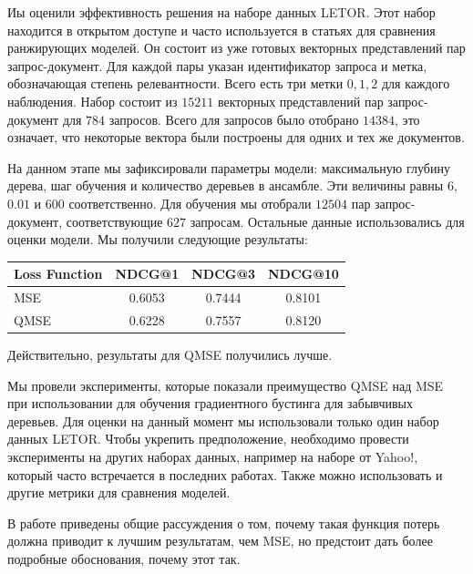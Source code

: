 \documentclass[specialist,
               substylefile = spbu.rtx,
               subf,href,colorlinks=true, 12pt]{disser}
\begin{document}
Иы оценили эффективность решения на наборе данных LETOR\cite{LETOR}. Этот набор находится в открытом доступе и часто используется в статьях для сравнения ранжирующих моделей. Он состоит из уже готовых векторных представлений пар запрос-документ. Для каждой пары указан идентификатор запроса и метка, обозначающая степень релевантности. Всего есть три метки $0, 1, 2$ для каждого наблюдения. Набор состоит из $15211$ векторных представлений пар запрос-документ для $784$ запросов. Всего для запросов было отобрано $14384$, это означает, что некоторые вектора были построены для одних и тех же документов.\par

На данном этапе мы зафиксировали параметры модели: максимальную глубину дерева, шаг обучения и количество деревьев в ансамбле. Эти величины равны $6$, $0.01$ и $600$ соответственно. Для обучения мы отобрали $12504$ пар запрос-документ, соответствующие $627$ запросам. Остальные данные использовались для оценки модели. Мы получили следующие результаты:\par 

\begin{center}
\begin{tabular} {l | c | c | c }
Loss Function & NDCG@1 & NDCG@3 &  NDCG@10 \\ \hline
MSE & 0.6053 & 0.7444 & 0.8101 \\ \hline
QMSE & 0.6228 & 0.7557 & 0.8120
\end{tabular}
\end{center}

Действительно, результаты для QMSE  получились лучше.

\conclusion

Мы провели эксперименты, которые показали преимущество QMSE над MSE при использовании для обучения градиентного бустинга для забывчивых деревьев. Для оценки на данный момент мы использовали только один набор данных LETOR. Чтобы укрепить предположение, необходимо провести эксперименты на других наборах данных, например на наборе от Yahoo!, который часто встречается в последних работах. Также можно использовать и другие метрики для сравнения моделей.\par

В работе приведены общие рассуждения о том, почему такая функция потерь должна приводит к лучшим результатам, чем MSE, но предстоит дать более подробные обоснования, почему этот так.\par 



\end{document}
